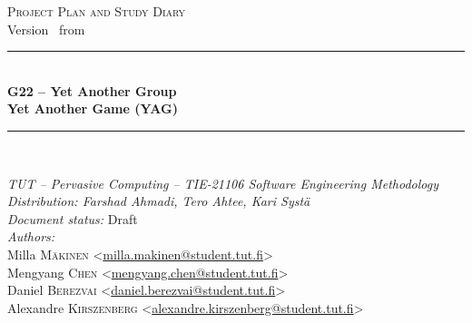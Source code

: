 \begin{titlepage}

\newcommand{\HRule}{\rule{\linewidth}{0.5mm}} %

\center %


\textsc{\Large Project Plan and Study Diary}\\[0.5cm]
{\large Version \vhCurrentVersion ~from \vhCurrentDate}\\[1cm]


\HRule \\[0.4cm]
{ \huge \bfseries G22 – Yet Another Group}\\[0.2cm]
{ \large \bfseries Yet Another Game (YAG)}\\[0.2cm]
\HRule \\[1.5cm]


\begin{minipage}{\textwidth}
\begin{flushleft} \small
\emph{TUT – Pervasive Computing – TIE-21106 Software Engineering Methodology} \\[0.5cm]
\emph{Distribution: Farshad Ahmadi, Tero Ahtee, Kari Syst{\"a}} \\[0.5cm]
\emph{Document status:} Draft \\[0.5cm]
\emph{Authors:}\\
Milla \textsc{Mäkinen} <\href{mailto:milla.makinen@student.tut.fi}{milla.makinen@student.tut.fi}> \\
Mengyang \textsc{Chen} <\href{mailto:mengyang.chen@student.tut.fi}{mengyang.chen@student.tut.fi}> \\
Daniel \textsc{Berezvai} <\href{mailto:daniel.berezvai@student.tut.fi}{daniel.berezvai@student.tut.fi}> \\
Alexandre \textsc{Kirszenberg} <\href{mailto:alexandre.kirszenberg@student.tut.fi}{alexandre.kirszenberg@student.tut.fi}>
\end{flushleft}
\end{minipage}


\end{titlepage}
